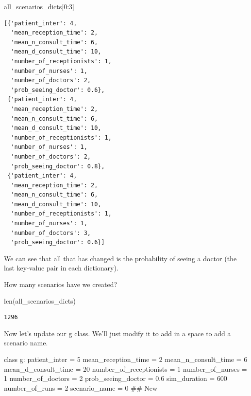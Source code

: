 \documentclass[
  letterpaper,
  DIV=11,
  numbers=noendperiod]{scrreprt}
\newenvironment{Shaded}{}{}
\newcommand{\BuiltInTok}[1]{\textcolor[rgb]{0.84,0.23,0.29}{#1}}
\newcommand{\CommentTok}[1]{\textcolor[rgb]{0.42,0.45,0.49}{#1}}
\newcommand{\DecValTok}[1]{\textcolor[rgb]{0.00,0.36,0.77}{#1}}
\newcommand{\FloatTok}[1]{\textcolor[rgb]{0.00,0.36,0.77}{#1}}
\newcommand{\KeywordTok}[1]{\textcolor[rgb]{0.84,0.23,0.29}{#1}}
\newcommand{\NormalTok}[1]{\textcolor[rgb]{0.14,0.16,0.18}{#1}}
\newcommand{\OperatorTok}[1]{\textcolor[rgb]{0.14,0.16,0.18}{#1}}
\begin{document}
\begin{Shaded}
\begin{Highlighting}[]
\NormalTok{all\_scenarios\_dicts[}\DecValTok{0}\NormalTok{:}\DecValTok{3}\NormalTok{]}
\end{Highlighting}
\end{Shaded}

\begin{verbatim}
[{'patient_inter': 4,
  'mean_reception_time': 2,
  'mean_n_consult_time': 6,
  'mean_d_consult_time': 10,
  'number_of_receptionists': 1,
  'number_of_nurses': 1,
  'number_of_doctors': 2,
  'prob_seeing_doctor': 0.6},
 {'patient_inter': 4,
  'mean_reception_time': 2,
  'mean_n_consult_time': 6,
  'mean_d_consult_time': 10,
  'number_of_receptionists': 1,
  'number_of_nurses': 1,
  'number_of_doctors': 2,
  'prob_seeing_doctor': 0.8},
 {'patient_inter': 4,
  'mean_reception_time': 2,
  'mean_n_consult_time': 6,
  'mean_d_consult_time': 10,
  'number_of_receptionists': 1,
  'number_of_nurses': 1,
  'number_of_doctors': 3,
  'prob_seeing_doctor': 0.6}]
\end{verbatim}

We can see that all that has changed is the probability of seeing a
doctor (the last key-value pair in each dictionary).

How many scenarios have we created?

\begin{Shaded}
\begin{Highlighting}[]
\BuiltInTok{len}\NormalTok{(all\_scenarios\_dicts)}
\end{Highlighting}
\end{Shaded}

\begin{verbatim}
1296
\end{verbatim}

Now let's update our g class. We'll just modify it to add in a space to
add a scenario name.

\begin{Shaded}
\begin{Highlighting}[]
\KeywordTok{class}\NormalTok{ g:}
\NormalTok{    patient\_inter }\OperatorTok{=} \DecValTok{5}
\NormalTok{    mean\_reception\_time }\OperatorTok{=} \DecValTok{2}
\NormalTok{    mean\_n\_consult\_time }\OperatorTok{=} \DecValTok{6}
\NormalTok{    mean\_d\_consult\_time }\OperatorTok{=} \DecValTok{20}
\NormalTok{    number\_of\_receptionists }\OperatorTok{=} \DecValTok{1}
\NormalTok{    number\_of\_nurses }\OperatorTok{=} \DecValTok{1}
\NormalTok{    number\_of\_doctors }\OperatorTok{=} \DecValTok{2}
\NormalTok{    prob\_seeing\_doctor }\OperatorTok{=} \FloatTok{0.6}
\NormalTok{    sim\_duration }\OperatorTok{=} \DecValTok{600}
\NormalTok{    number\_of\_runs }\OperatorTok{=} \DecValTok{2}
\NormalTok{    scenario\_name }\OperatorTok{=} \DecValTok{0} \CommentTok{\#\# New}
\end{Highlighting}
\end{Shaded}
\end{document}
